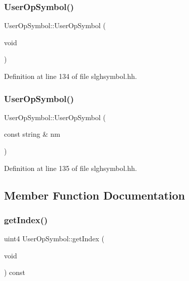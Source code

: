 \subsubsection{\texorpdfstring{UserOpSymbol()}{UserOpSymbol()}\hspace{0.1cm}{\footnotesize\ttfamily [1/2]}}
{\footnotesize\ttfamily User\+Op\+Symbol\+::\+User\+Op\+Symbol (\begin{DoxyParamCaption}\item[{void}]{ }\end{DoxyParamCaption})\hspace{0.3cm}{\ttfamily [inline]}}



Definition at line 134 of file slghsymbol.\+hh.

\mbox{\label{class_user_op_symbol_a04e8200caa0225befbcddce9e9361047}} 
\subsubsection{\texorpdfstring{UserOpSymbol()}{UserOpSymbol()}\hspace{0.1cm}{\footnotesize\ttfamily [2/2]}}
{\footnotesize\ttfamily User\+Op\+Symbol\+::\+User\+Op\+Symbol (\begin{DoxyParamCaption}\item[{const string \&}]{nm }\end{DoxyParamCaption})\hspace{0.3cm}{\ttfamily [inline]}}



Definition at line 135 of file slghsymbol.\+hh.



\subsection{Member Function Documentation}
\mbox{\label{class_user_op_symbol_ab62b03a3cb7d7dce34edc8f598b90700}} 
\subsubsection{\texorpdfstring{getIndex()}{getIndex()}}
{\footnotesize\ttfamily uint4 User\+Op\+Symbol\+::get\+Index (\begin{DoxyParamCaption}\item[{void}]{ }\end{DoxyParamCaption}) const\hspace{0.3cm}{\ttfamily [inline]}}



